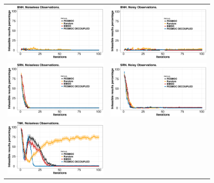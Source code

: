 \documentclass[review,preprint,12pt]{elsarticle}
\begin{document}
\begin{figure}[htb]
        \begin{tabular}{cc}
                \vspace{-.2cm}
                \includegraphics[width=0.475\linewidth]{../figures/benchmark/BNH_zeros_noiseless} &
                \includegraphics[width=0.475\linewidth]{../figures/benchmark/BNH_zeros_noisy} \\
                \includegraphics[width=0.475\linewidth]{../figures/benchmark/SRN_zeros_noiseless} &
                \includegraphics[width=0.475\linewidth]{../figures/benchmark/SRN_zeros_noisy} \\
                \includegraphics[width=0.475\linewidth]{../figures/benchmark/TNK_zeros_noiseless} &

\end{tabular}
\end{figure}
\end{document}
